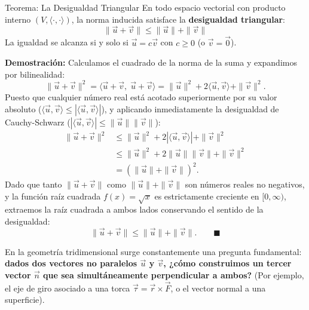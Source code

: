 \documentclass[11pt,letterpaper]{article}
\begin{document}
\begin{theorembox}{Teorema: La Desigualdad Triangular}
En todo espacio vectorial con producto interno $(V, \langle \cdot, \cdot \rangle)$, la norma inducida satisface la \textbf{desigualdad triangular}:
\[
\boxed{\|\vec{u} + \vec{v}\| \le \|\vec{u}\| + \|\vec{v}\|}
\]
La igualdad se alcanza si y solo si $\vec{u} = c\vec{v}$ con $c \ge 0$ (o $\vec{v} = \vec{0}$).

\vspace{0.2cm}
\textbf{Demostración:}
Calculamos el cuadrado de la norma de la suma y expandimos por bilinealidad:
\[
\|\vec{u} + \vec{v}\|^2 = \langle \vec{u} + \vec{v},\; \vec{u} + \vec{v} \rangle = \|\vec{u}\|^2 + 2\langle \vec{u}, \vec{v} \rangle + \|\vec{v}\|^2.
\]
Puesto que cualquier número real está acotado superiormente por su valor absoluto ($\langle \vec{u}, \vec{v} \rangle \le |\langle \vec{u}, \vec{v} \rangle|$), y aplicando inmediatamente la desigualdad de Cauchy-Schwarz ($|\langle \vec{u}, \vec{v} \rangle| \le \|\vec{u}\|\|\vec{v}\|$):
\begin{align*}
\|\vec{u} + \vec{v}\|^2 &\le \|\vec{u}\|^2 + 2|\langle \vec{u}, \vec{v} \rangle| + \|\vec{v}\|^2 \\
&\le \|\vec{u}\|^2 + 2\|\vec{u}\|\|\vec{v}\| + \|\vec{v}\|^2 \\
&= (\|\vec{u}\| + \|\vec{v}\|)^2.
\end{align*}
Dado que tanto $\|\vec{u} + \vec{v}\|$ como $\|\vec{u}\| + \|\vec{v}\|$ son números reales no negativos, y la función raíz cuadrada $f(x) = \sqrt{x}$ es estrictamente creciente en $[0, \infty)$, extraemos la raíz cuadrada a ambos lados conservando el sentido de la desigualdad:
\[
\|\vec{u} + \vec{v}\| \le \|\vec{u}\| + \|\vec{v}\|. \qquad \blacksquare
\]
\end{theorembox}


En la geometría tridimensional surge constantemente una pregunta fundamental: \textbf{dados dos vectores no paralelos $\vec{u}$ y $\vec{v}$, ¿cómo construimos un tercer vector $\vec{n}$ que sea simultáneamente perpendicular a ambos?} (Por ejemplo, el eje de giro asociado a una torca $\vec{\tau} = \vec{r} \times \vec{F}$, o el vector normal a una superficie).
\end{document}
